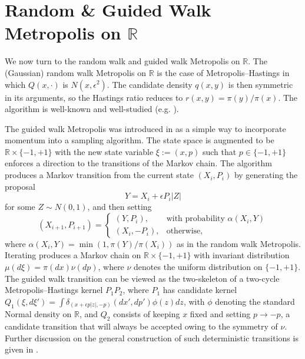 \documentclass{article}
\theoremstyle{definition}
\theoremstyle{plain}
\begin{document}
\section{Random \& Guided Walk Metropolis on $\mathbb{R}$}
\label{sec: RWM and GWM on 1D R}

We now turn to the random walk and guided walk Metropolis on $\mathbb{R}$. The (Gaussian) random walk Metropolis on $\mathbb{R}$ is the case of Metropolis--Hastings in which $Q(x,\cdot)$ is $N(x, \epsilon^2)$. The candidate density $q(x,y)$ is then symmetric in its arguments, so the Hastings ratio reduces to $r(x,y) = \pi(y)/\pi(x)$. The algorithm is well-known and well-studied (e.g. \cite{sherlock2010random}).

The guided walk Metropolis was introduced in \cite{GWM_intro} as a simple way to incorporate momentum into a sampling algorithm.  The state space is augmented to be $\mathbb{R} \times \{-1,+1\}$ with the new state variable $\xi := (x,p)$ such that $p \in \{-1,+1\}$ enforces a direction to the transitions of the Markov chain.  The algorithm produces a Markov transition from the current state $(X_i,P_i)$ by generating the proposal
\[
Y = X_i + \epsilon P_i|Z|
\]
for some $Z \sim N(0,1)$, and then setting 
\[
(X_{i+1},P_{i+1}) 
= 
\begin{cases}
    (Y,P_i), & \text{with probability } \alpha(X_i,Y) \\
    (X_i,-P_i), & \text{otherwise},
\end{cases}
\]
where $\alpha(X_i,Y) = \min(1, \pi(Y)/\pi(X_i))$ as in the random walk Metropolis.  Iterating produces a Markov chain on $\mathbb{R} \times \{-1,+1\}$ with invariant distribution $\mu(d\xi) = \pi(dx)\nu(dp)$, where $\nu$ denotes the uniform distribution on $\{-1,+1\}$.  The guided walk transition can be viewed as the two-skeleton of a two-cycle Metropolis--Hastings kernel $P_1P_2$, where $P_1$ has candidate kernel $Q_1(\xi,d\xi') = \int \delta_{(x+\epsilon p|z|,-p)}(dx',dp')\phi(z)dz$, with $\phi$ denoting the standard Normal density on $\mathbb{R}$, and $Q_2$ consists of keeping $x$ fixed and setting $p \to -p$, a candidate transition that will always be accepted owing to the symmetry of $\nu$.  Further discussion on the general construction of such deterministic transitions is given in \cite{tierney1998note,andrieu2020general, glatt2023accept}.
\end{document}
